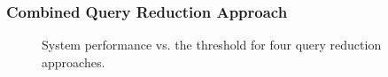 \subsubsection{Combined Query Reduction Approach}
\label{CombinedApproach}
\begin{figure}[t!]
\begin{centering}
 \hspace*{1.5cm}  
\par\end{centering} 
\protect\caption{System performance vs. the threshold for four query reduction approaches.}
\label{fig:combinedapproach}
\end{figure}
